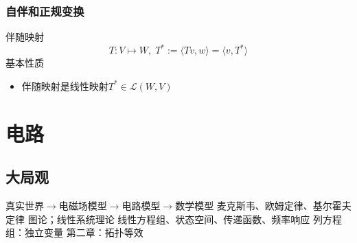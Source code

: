 \documentclass{tufte-book}
\begin{document}
\section{自伴和正规变换}
伴随映射
\[T:V\mapsto W,\;T^\ast := \langle Tv,w\rangle = \langle v, T^\ast\rangle \]
基本性质
\begin{itemize}
    \item 伴随映射是线性映射\(T^\ast \in \mathcal{L}(W,V)\)
\end{itemize}

\part{电路}
\chapter{大局观}
真实世界\(\overset{}{\longrightarrow}\)电磁场模型\(\overset{}{\longrightarrow}\)电路模型\(\overset{}{\longrightarrow}\)数学模型
麦克斯韦、欧姆定律、基尔霍夫定律
图论；线性系统理论
线性方程组、状态空间、传递函数、频率响应
列方程组：独立变量
第二章：拓扑等效
\backmatter
\printindex
\end{document}
